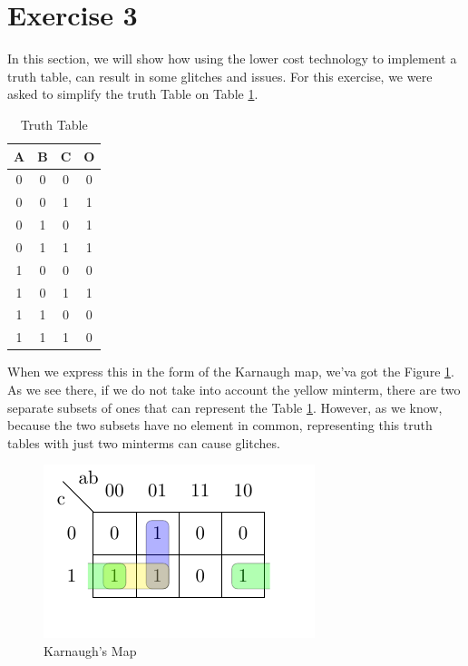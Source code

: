 
\section{Exercise 3}

In this section, we will show how using the lower cost technology
to implement a truth table, can result in some glitches and issues.
For this exercise, we were asked to simplify the truth Table on Table
\ref{3_1}.

\begin{table}[H]
\begin{centering}
\begin{tabular}{|c|c|c|c|}
\hline 
A & B & C & O\tabularnewline
\hline 
\hline 
0 & 0 & 0 & 0\tabularnewline
\hline 
0 & 0 & 1 & 1\tabularnewline
\hline 
0 & 1 & 0 & 1\tabularnewline
\hline 
0 & 1 & 1 & 1\tabularnewline
\hline 
1 & 0 & 0 & 0\tabularnewline
\hline 
1 & 0 & 1 & 1\tabularnewline
\hline 
1 & 1 & 0 & 0\tabularnewline
\hline 
1 & 1 & 1 & 0\tabularnewline
\hline 
\end{tabular}
\par\end{centering}
\caption{Truth Table}
\label{3_1}

\end{table}

When we express this in the form of the Karnaugh map, we'va got the
Figure \ref{3_2}. As we see there, if we do not take into account
the yellow minterm, there are two separate subsets of ones that can
represent the Table \ref{3_1}. However, as we know, because the two
subsets have no element in common, representing this truth tables
with just two minterms can cause glitches.

\begin{figure}[H]
\begin{centering}
\includegraphics{images/Karnaugh}
\par\end{centering}
\caption{Karnaugh's Map}
\label{3_2}

\end{figure}

